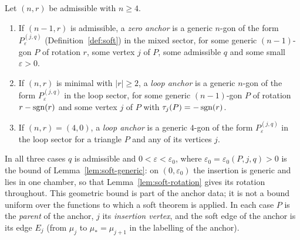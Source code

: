 \begin{definition}[anchors]\label{def:anchors}
Let $(n,r)$ be admissible with $n\geq4$.
\begin{enumerate}
\item[(Z)] If $(n-1,r)$ is admissible, a \emph{zero anchor} is a generic
$n$-gon of the form $P^{(j,q)}_\varepsilon$ (Definition~\ref{def:soft}) in
the mixed sector, for some generic $(n-1)$-gon $P$ of rotation $r$, some
vertex $j$ of $P$, some admissible $q$ and some small $\varepsilon>0$.
\item[(L)] If $(n,r)$ is minimal with $|r|\geq2$, a \emph{loop anchor} is a
generic $n$-gon of the form $P^{(j,q)}_\varepsilon$ in the loop sector, for
some generic $(n-1)$-gon $P$ of rotation $r-\operatorname{sgn}(r)$ and some vertex $j$ of
$P$ with $\tau_j(P)=-\operatorname{sgn}(r)$.
\item[(L$_0$)] If $(n,r)=(4,0)$, a \emph{loop anchor} is a generic $4$-gon
of the form $P^{(j,q)}_\varepsilon$ in the loop sector for a triangle $P$
and any of its vertices $j$.
\end{enumerate}
In all three cases $q$ is admissible and $0<\varepsilon<\varepsilon_0$, where
$\varepsilon_0=\varepsilon_0(P,j,q)>0$ is the bound of
Lemma~\ref{lem:soft-generic}: on $(0,\varepsilon_0)$ the insertion is generic
and lies in one chamber, so that Lemma~\ref{lem:soft-rotation} gives its
rotation throughout. This geometric bound is part of the anchor data; it is
not a bound uniform over the functions to which a soft theorem is applied.
In each case $P$ is the \emph{parent} of the anchor, $j$ its \emph{insertion
vertex}, and the soft edge of the anchor is its edge $E_j$ (from $\mu_j$ to
$\mu_*=\mu_{j+1}$ in the labelling of the anchor).
\end{definition}

